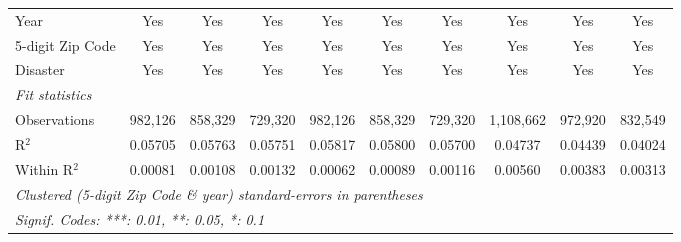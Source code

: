 \begin{tabular}{lccccccccc}
   Year                                                       & Yes            & Yes            & Yes            & Yes      & Yes           & Yes          & Yes       & Yes           & Yes\\  
   5-digit Zip Code                                           & Yes            & Yes            & Yes            & Yes      & Yes           & Yes          & Yes       & Yes           & Yes\\  
   Disaster                                                   & Yes            & Yes            & Yes            & Yes      & Yes           & Yes          & Yes       & Yes           & Yes\\  
   \midrule
   \emph{Fit statistics}\\
   Observations                                               & 982,126        & 858,329        & 729,320        & 982,126  & 858,329       & 729,320      & 1,108,662 & 972,920       & 832,549\\  
   R$^2$                                                      & 0.05705        & 0.05763        & 0.05751        & 0.05817  & 0.05800       & 0.05700      & 0.04737   & 0.04439       & 0.04024\\  
   Within R$^2$                                               & 0.00081        & 0.00108        & 0.00132        & 0.00062  & 0.00089       & 0.00116      & 0.00560   & 0.00383       & 0.00313\\  
   \midrule \midrule
   \multicolumn{10}{l}{\emph{Clustered (5-digit Zip Code \& year) standard-errors in parentheses}}\\
   \multicolumn{10}{l}{\emph{Signif. Codes: ***: 0.01, **: 0.05, *: 0.1}}\\
\end{tabular}
\par\endgroup
